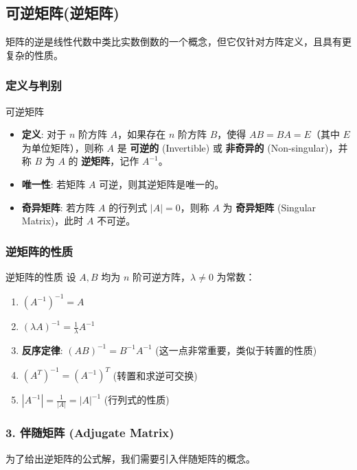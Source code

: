 \documentclass[a4paper,12pt]{ctexart}
\begin{document}
\subsection{可逆矩阵(逆矩阵)}

矩阵的逆是线性代数中类比实数倒数的一个概念，但它仅针对方阵定义，且具有更复杂的性质。

\subsubsection{定义与判别}
\begin{mydef}{可逆矩阵}{}
\begin{itemize}
    \item \textbf{定义}: 对于 $n$ 阶方阵 $A$，如果存在 $n$ 阶方阵 $B$，使得 $AB = BA = E$（其中 $E$ 为单位矩阵），则称 $A$ 是 \textbf{可逆的} (Invertible) 或 \textbf{非奇异的} (Non-singular)，并称 $B$ 为 $A$ 的 \textbf{逆矩阵}，记作 $A^{-1}$。
    \item \textbf{唯一性}: 若矩阵 $A$ 可逆，则其逆矩阵是唯一的。
    \item \textbf{奇异矩阵}: 若方阵 $A$ 的行列式 $|A| = 0$，则称 $A$ 为 \textbf{奇异矩阵} (Singular Matrix)，此时 $A$ 不可逆。
\end{itemize}
\end{mydef}



\subsubsection{逆矩阵的性质}
\begin{myprop}{逆矩阵的性质}{}
设 $A, B$ 均为 $n$ 阶可逆方阵，$\lambda \neq 0$ 为常数：
\begin{enumerate}
    \item $(A^{-1})^{-1} = A$
    \item $(\lambda A)^{-1} = \frac{1}{\lambda} A^{-1}$
    \item \textbf{反序定律}: $(AB)^{-1} = B^{-1}A^{-1}$ (这一点非常重要，类似于转置的性质)
    \item $(A^T)^{-1} = (A^{-1})^T$ (转置和求逆可交换)
    \item $|A^{-1}| = \frac{1}{|A|} = |A|^{-1}$ (行列式的性质)
\end{enumerate}
\end{myprop}

\newpage

\subsubsection{3. 伴随矩阵 (Adjugate Matrix)}
为了给出逆矩阵的公式解，我们需要引入伴随矩阵的概念。
\end{document}

